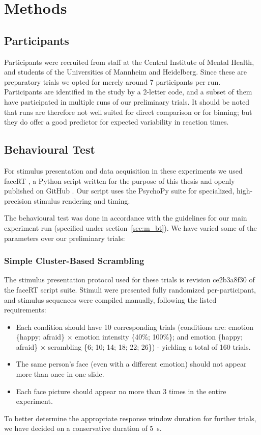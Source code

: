     \section{Methods}
	\subsection{Participants}
	    Participants were recruited from staff at the Central Institute of Mental Health, and students of the Universities of Mannheim and Heidelberg.
	    Since these are preparatory trials we opted for merely around 7 participants per run.
	    Participants are identified in the study by a 2-letter code, and a subset of them have participated in multiple runs of our preliminary trials.
	    It should be noted that runs are therefore not well suited for direct comparison or for binning; but they do offer a good predictor for expected variability in reaction times.
	\subsection{Behavioural Test}
	    For stimulus presentation and data acquisition in these experiments we used faceRT \citep{faceRT}, a Python script written for the purpose of this thesis and openly published on GitHub \citep{github}.
	    Our script uses the PsychoPy suite \citep{Peirce2008} for specialized, high-precision stimulus rendering and timing.
	    
	    The behavioural test was done in accordance with the guidelines for our main experiment run (specified under section~\ref{sec:m_bt}).
	    We have varied some of the parameters over our preliminary trials:
	    \subsubsection{Simple Cluster-Based Scrambling}\label{sec:pe_m_bt_ss}
		The stimulus presentation protocol used for these trials is revision \textcolor{lg}{ce2b3a8f30} of the faceRT \citep{faceRT} script suite.
		Stimuli were presented fully randomized per-participant, and stimulus sequences were compiled manually, following the listed requirements:
		\begin{itemize}
		    \item Each condition should have 10 corresponding trials (conditions are: emotion \{happy; afraid\} $\times$ emotion intensity \{40\%; 100\%\}; and emotion \{happy; afraid\} $\times$ scrambling \{6; 10; 14; 18; 22; 26\}) - yielding a total of 160 trials.
		    \item The same person's face (even with a different emotion) should not appear more than once in one slide.
		    \item Each face picture should appear no more than 3 times in the entire experiment.
		\end{itemize}
		To better determine the appropriate response window duration for further trials, we have decided on a conservative duration of \SI{5}{\second}.
